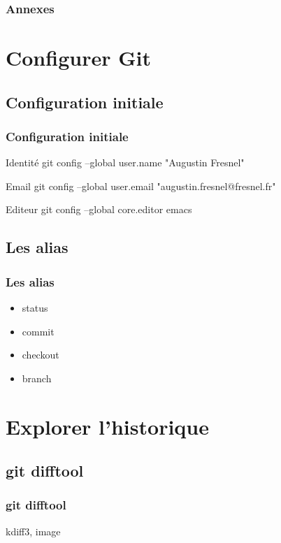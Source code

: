 \documentclass[t,11pt]{beamer}
\begin{document}
\appendix
\begin{frame}[c]
        \frametitle{Annexes}
        \tableofcontents[hideallsubsections]
\end{frame}

\section{Configurer Git}
\subsection{Configuration initiale}
\begin{frame}
        \frametitle{Configuration initiale}
        \begin{block}{Identit\'e}
                git config --global user.name "Augustin Fresnel"
        \end{block}
        
        \begin{block}{Email}
                git config --global user.email "augustin.fresnel@fresnel.fr"
        \end{block}

        \begin{block}{Editeur}
                git config --global core.editor emacs
        \end{block}
\end{frame}

\subsection{Les alias}
\begin{frame}
        \frametitle{Les alias}
        \begin{itemize}
                \item status
                \item commit
                \item checkout
                \item branch
        \end{itemize}
\end{frame}

\section{Explorer l'historique}
\subsection{git difftool}
\begin{frame}
        \frametitle{git difftool}
        kdiff3, image
\end{frame}
\end{document}
